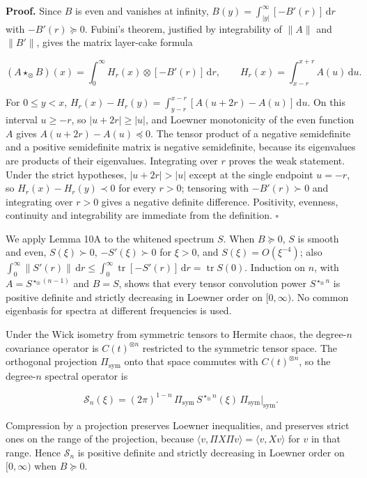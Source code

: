 \documentclass[
  british,
  11pt,
  a4paper,
]{article}
\begin{document}
\textbf{Proof.} Since \(B\) is even and vanishes at infinity,
\(B(y)=\int_{|y|}^\infty[-B'(r)]\,\mathrm dr\) with \(-B'(r)\succeq0\).
Fubini's theorem, justified by integrability of \(\|A\|\) and
\(\|B'\|\), gives the matrix layer-cake formula

\[
(A\star_\otimes B)(x)=
\int_0^\infty H_r(x)\otimes[-B'(r)]\,\mathrm dr,
\qquad H_r(x)=\int_{x-r}^{x+r}A(u)\,\mathrm du .
\]

For \(0\le y<x\),
\(H_r(x)-H_r(y)=\int_{y-r}^{x-r}[A(u+2r)-A(u)]\,\mathrm du\). On this
interval \(u\ge-r\), so \(|u+2r|\ge|u|\), and Loewner monotonicity of
the even function \(A\) gives \(A(u+2r)-A(u)\preceq0\). The tensor
product of a negative semidefinite and a positive semidefinite matrix is
negative semidefinite, because its eigenvalues are products of their
eigenvalues. Integrating over \(r\) proves the weak statement. Under the
strict hypotheses, \(|u+2r|>|u|\) except at the single endpoint
\(u=-r\), so \(H_r(x)-H_r(y)\prec0\) for every \(r>0\); tensoring with
\(-B'(r)\succ0\) and integrating over \(r>0\) gives a negative definite
difference. Positivity, evenness, continuity and integrability are
immediate from the definition. \(\square\)

We apply Lemma 10A to the whitened spectrum \(S\). When \(B\succeq0\),
\(S\) is smooth and even, \(S(\xi)\succ0\), \(-S'(\xi)\succ0\) for
\(\xi>0\), and \(S(\xi)=O(\xi^{-4})\); also
\(\int_0^\infty\|S'(r)\|\,\mathrm dr\le\int_0^\infty\operatorname{tr}[-S'(r)]\,\mathrm dr=\operatorname{tr}S(0)\).
Induction on \(n\), with \(A=S^{\star_\otimes(n-1)}\) and \(B=S\), shows
that every tensor convolution power \(S^{\star_\otimes n}\) is positive
definite and strictly decreasing in Loewner order on \([0,\infty)\). No
common eigenbasis for spectra at different frequencies is used.

Under the Wick isometry from symmetric tensors to Hermite chaos, the
degree-\(n\) covariance operator is \(C(t)^{\otimes n}\) restricted to
the symmetric tensor space. The orthogonal projection
\(\Pi_{\mathrm{sym}}\) onto that space commutes with
\(C(t)^{\otimes n}\), so the degree-\(n\) spectral operator is

\[
\mathcal S_n(\xi)=(2\pi)^{1-n}\,\Pi_{\mathrm{sym}}\,S^{\star_\otimes n}(\xi)\,\Pi_{\mathrm{sym}}\big|_{\mathrm{sym}} .
\]

Compression by a projection preserves Loewner inequalities, and
preserves strict ones on the range of the projection, because
\(\langle v,\Pi X\Pi v\rangle=\langle v,Xv\rangle\) for \(v\) in that
range. Hence \(\mathcal S_n\) is positive definite and strictly
decreasing in Loewner order on \([0,\infty)\) when \(B\succeq0\).
\end{document}
